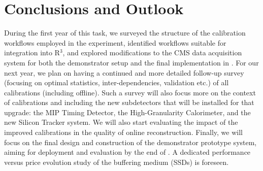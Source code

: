 \chapter{Conclusions and Outlook} \label{sec:conclusions_and_outlook}

During the first year of this task, 
we surveyed the structure of the calibration workflows employed in the experiment, 
identified workflows suitable for integration into R$^3$, 
and explored modifications to the CMS data acquisition system for both the demonstrator setup and the final implementation in \Phasetwo.
For our next year, we plan on having a continued and more detailed follow-up survey (focusing on optimal statistics, inter-dependencies, validation etc.) of all calibrations (including offline). Such a survey will also focus more on the context of \Phasetwo calibrations and including the new subdetectors that will be installed for that upgrade: 
the MIP Timing Detector,
the High-Granularity Calorimeter,
and the
new Silicon Tracker system.
We will also start evaluating the impact of the improved calibrations in the quality of online reconstruction.
Finally, we will focus on the final design and construction of the demonstrator prototype system, aiming for deployment and evaluation by the end of \Runthree. A dedicated performance versus price evolution study of the buffering medium (SSDs) is foreseen.